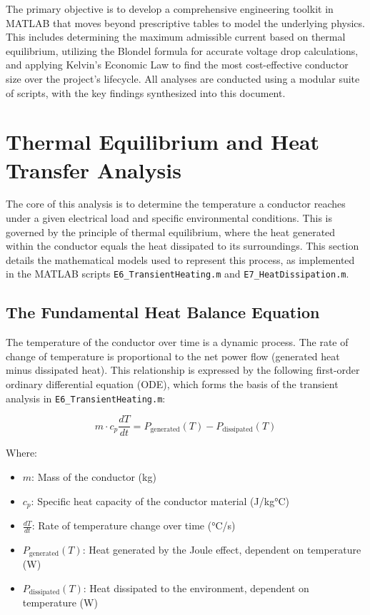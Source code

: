 \documentclass[12pt, a4paper]{article}
\begin{document}
The primary objective is to develop a comprehensive engineering toolkit in MATLAB that moves beyond prescriptive tables to model the underlying physics. This includes determining the maximum admissible current based on thermal equilibrium, utilizing the Blondel formula for accurate voltage drop calculations, and applying Kelvin's Economic Law to find the most cost-effective conductor size over the project's lifecycle. All analyses are conducted using a modular suite of scripts, with the key findings synthesized into this document.
\section{Thermal Equilibrium and Heat Transfer Analysis}

The core of this analysis is to determine the temperature a conductor reaches under a given electrical load and specific environmental conditions. This is governed by the principle of thermal equilibrium, where the heat generated within the conductor equals the heat dissipated to its surroundings. This section details the mathematical models used to represent this process, as implemented in the MATLAB scripts \texttt{E6\_TransientHeating.m} and \texttt{E7\_HeatDissipation.m}.

\subsection{The Fundamental Heat Balance Equation}

The temperature of the conductor over time is a dynamic process. The rate of change of temperature is proportional to the net power flow (generated heat minus dissipated heat). This relationship is expressed by the following first-order ordinary differential equation (ODE), which forms the basis of the transient analysis in \texttt{E6\_TransientHeating.m}:

\begin{equation}
m \cdot c_p \frac{dT}{dt} = P_{\text{generated}}(T) - P_{\text{dissipated}}(T)
\label{eq:ode}
\end{equation}

Where:
\begin{itemize}
    \item $m$: Mass of the conductor (kg)
    \item $c_p$: Specific heat capacity of the conductor material (J/kg°C)
    \item $\frac{dT}{dt}$: Rate of temperature change over time (°C/s)
    \item $P_{\text{generated}}(T)$: Heat generated by the Joule effect, dependent on temperature (W)
    \item $P_{\text{dissipated}}(T)$: Heat dissipated to the environment, dependent on temperature (W)
\end{itemize}
\end{document}
